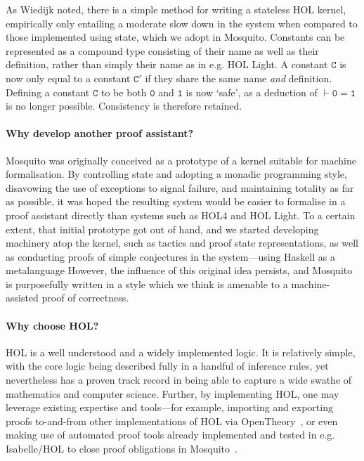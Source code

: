 \documentclass{llncs}
\newcommand{\mosquito}{Mosquito\xspace}
\begin{document}
As Wiedijk noted, there is a simple method for writing a stateless HOL kernel, empirically only entailing a moderate slow down in the system when compared to those implemented using state, which we adopt in \mosquito.
Constants can be represented as a compound type consisting of their name as well as their definition, rather than simply their name as in e.g. HOL Light.
A constant $\mathtt{C}$ is now only equal to a constant $\mathtt{C'}$ if they share the same name \emph{and} definition.
Defining a constant $\mathtt{C}$ to be both $\mathtt{0}$ and $\mathtt{1}$ is now `safe', as a deduction of $\vdash \mathtt{0 = 1}$ is no longer possible.
Consistency is therefore retained.

\paragraph{Why develop another proof assistant?}
\mosquito was originally conceived as a prototype of a kernel suitable for machine formalisation.
By controlling state and adopting a monadic programming style, disavowing the use of exceptions to signal failure, and maintaining totality as far as possible, it was hoped the resulting system would be easier to formalise in a proof assistant directly than systems such as HOL4 and HOL Light.
To a certain extent, that initial prototype got out of hand, and we started developing machinery atop the kernel, such as tactics and proof state representations, as well as conducting proofs of simple conjectures in the system---using Haskell as a metalanguage
However, the influence of this original idea persists, and \mosquito is purposefully written in a style which we think is amenable to a machine-assisted proof of correctness.

\paragraph{Why choose HOL?}
HOL is a well understood and a widely implemented logic.
It is relatively simple, with the core logic being described fully in a handful of inference rules, yet nevertheless has a proven track record in being able to capture a wide swathe of mathematics and computer science.
Further, by implementing HOL, one may leverage existing expertise and tools---for example, importing and exporting proofs to-and-from other implementations of HOL via OpenTheory~\cite{hurd:opentheory:2011}, or even making use of automated proof tools already implemented and tested in e.g. Isabelle/HOL to close proof obligations in \mosquito~\cite{kumar:standalone:2012}.
\end{document}
